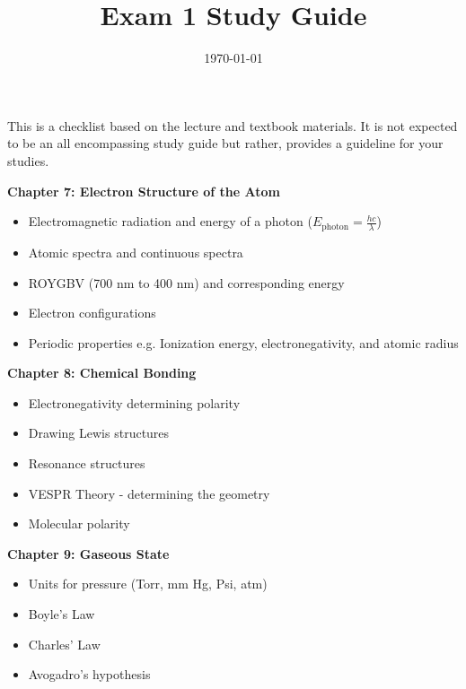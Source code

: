 \documentclass[12pt]{article}
\title{\textbf{Exam 1 Study Guide}}
\date{\today}
\begin{document}
\maketitle 

This is a checklist based on the lecture and textbook materials. It is not
expected to be an all encompassing study guide but rather, provides a guideline for
your studies.

\textbf{Chapter 7: Electron Structure of the Atom}

\begin{itemize}
\item Electromagnetic radiation and energy of a photon
  ($E_\text{photon} = \frac{hc}{\lambda}$)
\item Atomic spectra and continuous spectra
\item ROYGBV (700 nm to 400 nm) and corresponding energy
\item Electron configurations
\item Periodic properties e.g. Ionization energy, electronegativity, and
  atomic radius
\end{itemize}

\textbf{Chapter 8: Chemical Bonding}

\begin{itemize}
\item Electronegativity determining polarity
\item Drawing Lewis structures
\item Resonance structures
\item VESPR Theory - determining the geometry
\item Molecular polarity
\end{itemize}

\textbf{Chapter 9: Gaseous State}

\begin{itemize}
\item Units for pressure (Torr, mm Hg, Psi, atm)
\item Boyle's Law
\item Charles' Law
\item Avogadro's hypothesis
\end{itemize}
\end{document}
